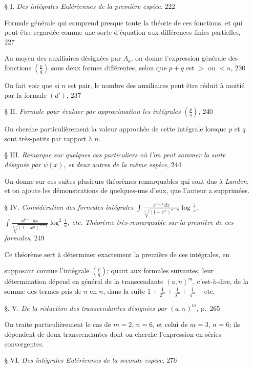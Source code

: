 \documentclass{article}
\begin{document}
§ I. \emph{Des intégrales Eulériennes de la première espèce}, 222

Formule générale qui comprend presque toute la théorie de ces fonctions, et qui peut être regardée comme une sorte d'équation aux différences finies partielles, 227

Au moyen des auxiliaires désignées par $A_{a}$, on donne l'expression générale des fonctions $\left(\frac{p}{q}\right)$ sous deux formes différentes, selon que $p+q$ est $>$ ou $<n$, 230

On fait voir que si $n$ est pair, le nombre des auxiliaires peut être réduit à moitié par la formule $(d')$, 237

§ II. \emph{Formule pour évaluer par approximation les intégrales $\left(\frac{p}{q}\right)$}, 240

On cherche particulièrement la valeur approchée de cette intégrale lorsque $p$ et $q$ sont très-petits par rapport à $n$.

§ III. \emph{Remarque sur quelques cas particuliers où l'on peut sommer la suite désignée par $\psi(x)$, et deux autres de la même espèce}, 244

On donne sur ces suites plusieurs théorèmes remarquables qui sont dus à \emph{Landen}, et on ajoute les démonstrations de quelques-uns d'eux, que l'auteur a supprimées.

§ IV. \emph{Considération des formules intégrales $\displaystyle\int\frac{x^{p-1}\,dx}{\sqrt[n]{(1-x^{n})^{n-q}}}\log\frac{1}{x}$, $\displaystyle\int\frac{x^{p-1}\,dx}{\sqrt[n]{(1-x^{n})^{n-q}}}\log^{2}\frac{1}{x}$, etc. Théorème très-remarquable sur la première de ces formules}, 249

Ce théorème sert à déterminer exactement la première de ces intégrales, en

supposant connue l'intégrale $\left(\frac{p}{q}\right)$; quant aux formules suivantes, leur détermination dépend en général de la transcendante $(a,n)^{m}$, c'est-à-dire, de la somme des termes pris de $n$ en $n$, dans la suite $1+\frac{1}{2^{m}}+\frac{1}{3^{m}}+\frac{1}{4^{m}}+\text{etc.}$

§. V. \emph{De la réduction des transcendantes désignées par $(a,n)^{m}$}, p.~265

On traite particulièrement le cas de $m=2$, $n=6$, et celui de $m=3$, $n=6$; ils dépendent de deux transcendantes dont on cherche l'expression en séries convergentes.

§ VI. \emph{Des intégrales Eulériennes de la seconde espèce}, 276
\end{document}
